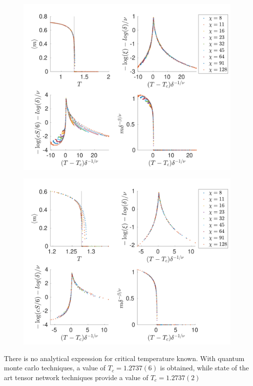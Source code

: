 \begin{figure}
  \center
  \includegraphics[width=\textwidth]{Figuren/phasediag/g25/Full.pdf}
  \caption{  }
  \label{fig:phase:g25:full}
\end{figure}

\begin{figure}
  \center
  \includegraphics[width=\textwidth]{Figuren/phasediag/g25/zoomed.pdf}
  \caption{  }
  \label{fig:phase:g25:zoomed}
\end{figure}

There is no analytical expression for critical temperature known. With quantum monte carlo techniques, a value of $T_c=1.2737(6)$ is obtained, while state of the art tensor network techniques provide a value of $T_c=1.2737(2)$ \cite{Czarnik2019}

